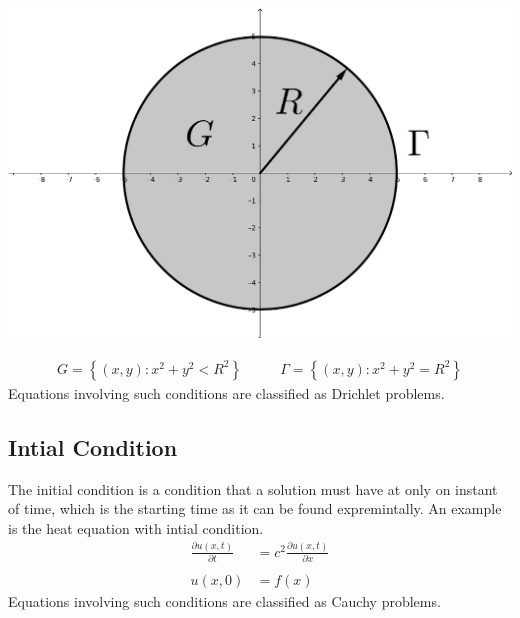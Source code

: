 \documentclass[]{article}
\begin{document}
\begin{center}
\includegraphics[scale=0.1]{laplacecircle.png} 
\end{center}


\begin{align*}
G = \left\lbrace (x,y):x^2+y^2 < R^2 \right\rbrace  \;\;\;\;\;\;\;\;\;\ \Gamma = \left\lbrace (x,y):x^2+y^2 = R^2 \right\rbrace
\end{align*}
Equations involving such conditions are classified as Drichlet problems.

\subsection*{Intial Condition}
The initial condition is a condition that a solution must have at only on instant of time, which is the starting time as it can be found expremintally. An example is the heat equation with intial condition.
\begin{align*}
\frac{\partial u(x,t)}{\partial t}  &= c^2 \frac{\partial u(x,t)}{\partial x}
\\
\\
u(x,0) &= f(x)
\end{align*}
Equations involving such conditions are classified as Cauchy problems.
\end{document}
